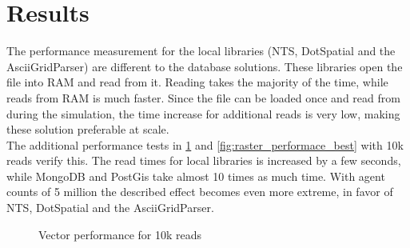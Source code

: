 \section{Results}
The performance measurement for the local libraries (NTS, DotSpatial and the AsciiGridParser) are different to the database solutions. These libraries open the file into RAM and read from it. Reading takes the majority of the time, while reads from RAM is much faster. Since the file can be loaded once and read from during the simulation, the time increase for additional reads is very low, making these solution preferable at scale.\\
The additional performance tests in \ref{fig:vector_performace_best} and \ref{fig:raster_performace_best} with 10k reads verify this. The read times for local libraries is increased by a few seconds, while MongoDB and PostGis take almost 10 times as much time. With agent counts of 5 million the described effect becomes even more extreme, in favor of NTS, DotSpatial and the AsciiGridParser.

\begin{figure}[H]
	\caption{Vector performance for 10k reads}
	\label{fig:vector_performace_best}
\end{figure}

